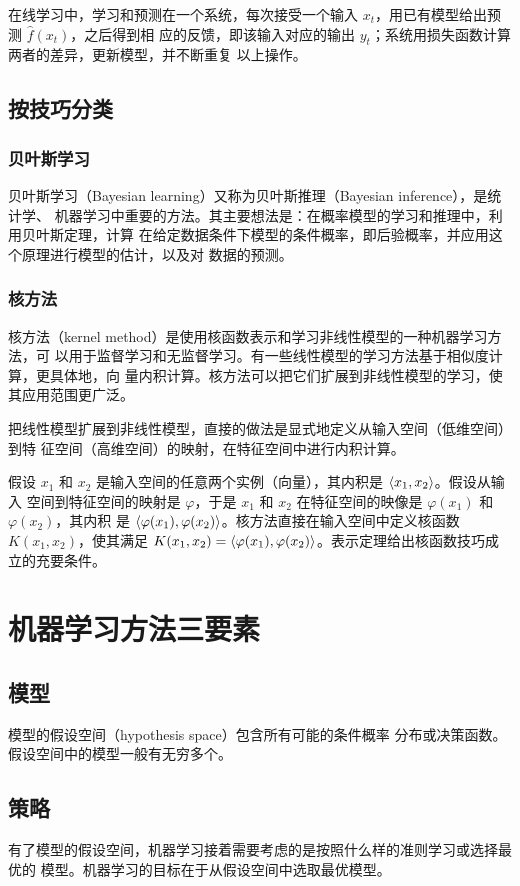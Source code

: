 在线学习中，学习和预测在一个系统，每次接受一个输入 $x_t$，用已有模型给出预测 $\hat{f}(x_t)$，之后得到相
应的反馈，即该输入对应的输出 $y_t$；系统用损失函数计算两者的差异，更新模型，并不断重复
以上操作。

\subsection{按技巧分类}
\subsubsection*{贝叶斯学习}
贝叶斯学习（Bayesian learning）又称为贝叶斯推理（Bayesian inference），是统计学、
机器学习中重要的方法。其主要想法是：在概率模型的学习和推理中，利用贝叶斯定理，计算
在给定数据条件下模型的条件概率，即后验概率，并应用这个原理进行模型的估计，以及对
数据的预测。
\subsubsection*{核方法}
核方法（kernel method）是使用核函数表示和学习非线性模型的一种机器学习方法，可
以用于监督学习和无监督学习。有一些线性模型的学习方法基于相似度计算，更具体地，向
量内积计算。核方法可以把它们扩展到非线性模型的学习，使其应用范围更广泛。

把线性模型扩展到非线性模型，直接的做法是显式地定义从输入空间（低维空间）到特
征空间（高维空间）的映射，在特征空间中进行内积计算。


假设 $x_1$ 和 $x_2$ 是输入空间的任意两个实例（向量），其内积是 $\Braket{x_1, x_2}$。假设从输入
空间到特征空间的映射是 $\varphi$，于是 $x_1$ 和 $x_2$ 在特征空间的映像是 $\varphi(x_1)$ 和 $\varphi(x_2)$，其内积
是 $\Braket{\varphi(x_1), \varphi(x_2)}$。核方法直接在输入空间中定义核函数 $K(x_1, x_2)$，使其满足 $K(x_1, x_2) = \Braket{\varphi(x_1), \varphi(x_2)}$。表示定理给出核函数技巧成立的充要条件。

\section{机器学习方法三要素}
\subsection{模型}
模型的假设空间（hypothesis space）包含所有可能的条件概率
分布或决策函数。假设空间中的模型一般有无穷多个。
\subsection{策略}
有了模型的假设空间，机器学习接着需要考虑的是按照什么样的准则学习或选择最优的
模型。机器学习的目标在于从假设空间中选取最优模型。

